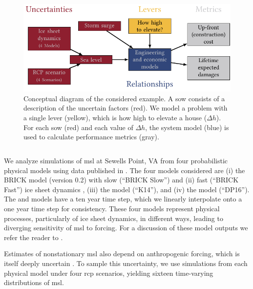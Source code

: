 \documentclass[11pt]{article}
\begin{document}
\begin{figure}
    \centering
    \includegraphics[width=\textwidth]{xlrm.pdf}
    \caption{
        Conceptual diagram of the considered example.
        A \acrfull{sow} consists of a description of the uncertain factors (red).
        We model a problem with a single lever (yellow), which is how high to elevate a house ($\Delta h$).
        For each \acrshort{sow} (red) and each value of $\Delta h$, the system model (blue) is used to calculate performance metrics (gray).
    }\label{fig:xlrm}
\end{figure}

\subsection{}\label{sec:case-slr}

We analyze simulations of \gls{msl} at Sewells Point, VA from four probabilistic physical models using data published in \citet{ruckert_coastal:2019}.
The four models considered are (i) the BRICK model (version 0.2) with slow (``BRICK Slow'') and (ii) fast (``BRICK Fast'') ice sheet dynamics \citep{wong_brick0.2:2017}, (iii) the \citet{kopp_probabilistic:2014} model (``K14''), and (iv) the \citet{deconto_antarctica:2016} model (``DP16'').
The \citet{kopp_probabilistic:2014} and \citet{deconto_antarctica:2016} models have a ten year time step, which we linearly interpolate onto a one year time step for consistency.
These four models represent physical processes, particularly of ice sheet dynamics, in different ways, leading to diverging sensitivity of \gls{msl} to forcing.
For a discussion of these model outputs we refer the reader to \citet{ruckert_coastal:2019}.

Estimates of nonstationary \gls{msl} also depend on anthropogenic forcing, which is itself deeply uncertain \citep{ho_scenarios:2019,srikrishnan_probabilistic:2022}.
To sample this uncertainty, we use simulations from each physical model under four \gls{rcp} scenarios, yielding sixteen time-varying distributions of \gls{msl}.
\end{document}
